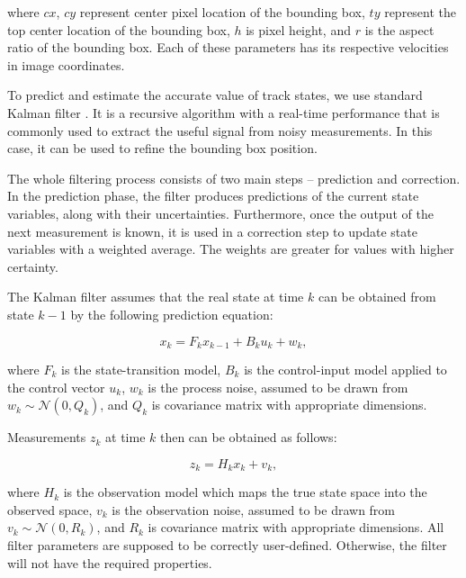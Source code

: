         where $cx$, $cy$ represent center pixel location of the bounding box, $ty$ represent the top center location of the bounding box, $h$ is pixel height, and $r$ is the aspect ratio of the bounding box. Each of these parameters has its respective velocities in image coordinates. 
        
        To predict and estimate the accurate value of track states, we use standard Kalman filter \cite{kalman1960new}. It is a recursive algorithm with a real-time performance that is commonly used to extract the useful signal from noisy measurements. In this case, it can be used to refine the bounding box position. 
        
        The whole filtering process consists of two main steps -- prediction and correction. In the prediction phase, the filter produces predictions of the current state variables, along with their uncertainties. Furthermore, once the output of the next measurement is known, it is used in a correction step to update state variables with a weighted average. The weights are greater for values with higher certainty.
  
        The Kalman filter assumes that the real state at time $k$ can be obtained from state $k - 1$ by the following prediction equation: 
        
        \begin{equation}
            x_k = F_k x_{k-1} + B_k u_k + w_k,
        \end{equation}
        
        where $F_k$ is the  state-transition model, $B_k$ is the control-input model applied to the control vector $u_k$, $w_k$ is the process noise, assumed to be drawn from 
        $w_k \sim {\mathcal {N}} (0,Q_k)$, and $Q_k$ is covariance matrix with appropriate dimensions.
        
        Measurements $z_k$ at time $k$ then can be obtained as follows:
        
        \begin{equation}
           z_{k} = H_{k} x_{k} + v_{k},
        \end{equation}
        
        where $H_k$ is the observation model which maps the true state space into the observed space, $v_k$ is the observation noise, assumed to be drawn from 
        $v_k \sim {\mathcal {N}} (0,R_k)$, and $R_k$ is covariance matrix with appropriate dimensions. All filter parameters are supposed to be correctly user-defined. Otherwise, the filter will not have the required properties.

